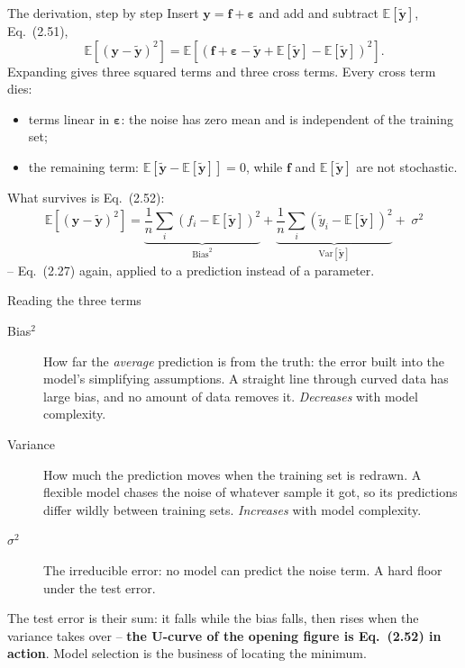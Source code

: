 \documentclass[10pt,aspectratio=169]{beamer}
\begin{document}
\begin{frame}{The derivation, step by step}
Insert $\bm{y}=\bm{f}+\bm{\varepsilon}$ and add and subtract
$\mathbb{E}[\tilde{\bm{y}}]$, Eq.~(2.51),
\[
  \mathbb{E}\left[(\bm{y}-\tilde{\bm{y}})^2\right]
   = \mathbb{E}\left[\left(\bm{f}+\bm{\varepsilon}-\tilde{\bm{y}}
     +\mathbb{E}[\tilde{\bm{y}}]-\mathbb{E}[\tilde{\bm{y}}]\right)^2\right].
\]
Expanding gives three squared terms and three cross terms.  Every cross term
dies:
\begin{itemize}
  \item terms linear in $\bm{\varepsilon}$: the noise has zero mean and is
        independent of the training set;
  \item the remaining term: $\mathbb{E}\left[\tilde{\bm{y}}
        -\mathbb{E}[\tilde{\bm{y}}]\right]=0$, while $\bm{f}$ and
        $\mathbb{E}[\tilde{\bm{y}}]$ are not stochastic.
\end{itemize}
What survives is Eq.~(2.52):
\[
  \boxed{\;
  \mathbb{E}\left[(\bm{y}-\tilde{\bm{y}})^2\right]
   = \underbrace{\frac{1}{n}\sum_i\left(f_i-\mathbb{E}[\tilde{\bm{y}}]\right)^2}_{\mathrm{Bias}^2}
   + \underbrace{\frac{1}{n}\sum_i\left(\tilde{y}_i-\mathbb{E}[\tilde{\bm{y}}]\right)^2}_{\mathrm{Var}[\tilde{\bm{y}}]}
   + \;\sigma^2
  \;}
\]
-- Eq.~(2.27) again, applied to a prediction instead of a parameter.
\end{frame}

\begin{frame}{Reading the three terms}
\begin{description}
  \item[Bias$^2$] How far the \emph{average} prediction is from the truth:
        the error built into the model's simplifying assumptions.  A straight
        line through curved data has large bias, and no amount of data
        removes it.  \emph{Decreases} with model complexity.
  \item[Variance] How much the prediction moves when the training set is
        redrawn.  A flexible model chases the noise of whatever sample it
        got, so its predictions differ wildly between training sets.
        \emph{Increases} with model complexity.
  \item[$\sigma^2$] The irreducible error: no model can predict the noise
        term.  A hard floor under the test error.
\end{description}
\vspace{4pt}
The test error is their sum: it falls while the bias falls, then rises when
the variance takes over -- \textbf{the U-curve of the opening figure is
Eq.~(2.52) in action}.  Model selection is the business of locating the
minimum.
\end{frame}
\end{document}

